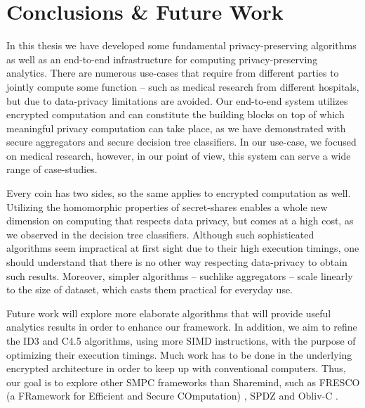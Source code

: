 \chapter{Conclusions \& Future Work}\label{c:conclusions}
In this thesis we have developed some fundamental privacy\hyp preserving algorithms as well as an end\hyp to\hyp end infrastructure for computing privacy\hyp preserving analytics.
There are numerous use\hyp cases that require from different parties to jointly compute some function -- such as medical research from different hospitals, but due to data\hyp privacy limitations are avoided.
Our end\hyp to\hyp end system utilizes encrypted computation and can constitute the building blocks on top of which meaningful privacy computation can take place, as we have demonstrated with secure aggregators and secure decision tree classifiers.
In our use\hyp case, we focused on medical research, however, in our point of view, this system can serve a wide range of case\hyp studies.


Every coin has two sides, so the same applies to encrypted computation as well.
Utilizing the homomorphic properties of secret\hyp shares enables a whole new dimension on computing that respects data privacy, but comes at a high cost, as we observed in the decision tree classifiers.
Although such sophisticated algorithms seem impractical at first sight due to their high execution timings, one should understand that there is no other way respecting data\hyp privacy to obtain such results.
Moreover, simpler algorithms -- suchlike aggregators -- scale linearly to the size of dataset, which casts them practical for everyday use.


Future work will explore more elaborate algorithms that will provide useful analytics results in order to enhance our framework.
In addition, we aim to refine the ID3 and C4.5 algorithms, using more SIMD instructions, with the purpose of optimizing their execution timings.
Much work has to be done in the underlying encrypted architecture in order to keep up with conventional computers.
Thus, our goal is to explore other SMPC frameworks than Sharemind, such as FRESCO (a FRamework for Efficient and Secure COmputation) \cite{chan2017privacy, alxd1}, SPDZ \cite{damgaard2012multiparty, damgaard2013practical} and Obliv\hyp C \cite{zahur2015obliv}.



